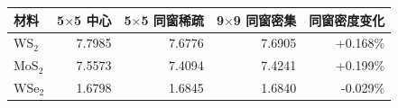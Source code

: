 \begin{tabular}{lrrrr}
\toprule
材料 & 5$\times$5 中心 & 5$\times$5 同窗稀疏 & 9$\times$9 同窗密集 & 同窗密度变化 \\
\midrule
WS$_2$ & 7.7985 & 7.6776 & 7.6905 & +0.168\% \\
MoS$_2$ & 7.5573 & 7.4094 & 7.4241 & +0.199\% \\
WSe$_2$ & 1.6798 & 1.6845 & 1.6840 & -0.029\% \\
\bottomrule
\end{tabular}
